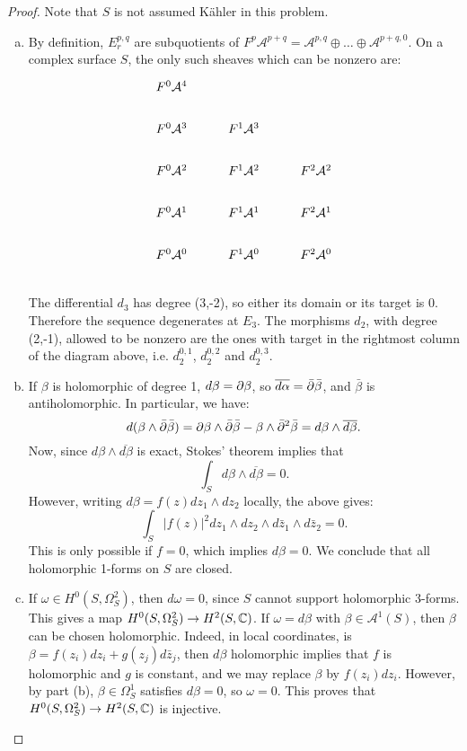 \documentclass{article}
\begin{document}
\begin{proof}
Note that $S$ is not assumed K\"ahler in this problem.
\begin{enumerate}[(a)]
\item By definition, $E_r^{p,q}$ are subquotients of $F^p\mathcal{A}^{p+q} = \mathcal{A}^{p,q} \oplus \dots
\oplus \mathcal{A}^{p+q,0}$. On a complex surface $S$, the only such sheaves which can be nonzero are:
\[
\begin{tikzcd}
F^0\mathcal{A}^4 &  &  \\
F^0\mathcal{A}^3 & F^1\mathcal{A}^3 & \\
F^0\mathcal{A}^2 & F^1\mathcal{A}^2 & F^2\mathcal{A}^2 \\
F^0\mathcal{A}^1 & F^1\mathcal{A}^1 & F^2\mathcal{A}^1 \\
F^0\mathcal{A}^0 & F^1\mathcal{A}^0 & F^2\mathcal{A}^0 \\
\end{tikzcd}
\]
The differential $d_3$ has degree (3,-2), so either its domain or its target is 0. Therefore the sequence
degenerates at $E_3$. The morphisms $d_2$, with degree (2,-1), allowed to be nonzero are the ones 
with target in the rightmost
column of the diagram above, i.e. $d_2^{0,1}$, $d_2^{0,2}$ and $d_2^{0,3}$.

\item If $\beta$ is holomorphic of degree 1, $d\beta = \partial \beta$, so $\overline{d\alpha} = \bar {\partial} \bar \beta$,
and $\bar \beta$ is antiholomorphic. In particular, we have:
\[  d(\beta \wedge \bar {\partial} \bar \beta) = \partial \beta \wedge \bar {\partial} \bar \beta - \beta \wedge \bar {\partial}^2 \bar \beta
= d\beta \wedge \overline{d\beta}. \]
Now, since $d\beta \wedge \overline{d\beta}$ is exact, Stokes' theorem implies that
\[	\int_S d\beta \wedge \overline{d\beta} = 0.	\]
However, writing $d\beta = f(z) dz_1 \wedge dz_2$ locally, the above gives:
\[	\int_S |f(z)|^2 dz_1 \wedge dz_2 \wedge d\bar z_1 \wedge d\bar z_2 = 0.	\]
This is only possible if $f = 0$, which implies $d \beta = 0$. We conclude that all holomorphic 1-forms on $S$
are closed.

\item If $\omega \in H^0(S,\Omega^2_S)$, then $d\omega = 0$, since $S$ cannot support holomorphic 3-forms. This
gives a map $H^0(S,\Omega^2_S) \to H^2(S,\mathbb{C})$. If $\omega = d \beta$ with $\beta \in \mathcal{A}^1(S)$, then
$\beta$ can be chosen holomorphic. Indeed, in local coordinates, is $\beta = f(z_i) dz_i + g(z_j) d\bar z_j$,
then $d \beta$ holomorphic implies that $f$ is holomorphic and $g$ is constant, and we may replace $\beta$ by
$f(z_i) dz_i$. However, by part (b), $\beta \in \Omega_S^1$ satisfies $d\beta = 0$, so $\omega = 0$. This
proves that $H^0(S,\Omega^2_S) \to H^2(S,\mathbb{C})$ is injective.


\end{enumerate}
\end{proof}
\end{document}
